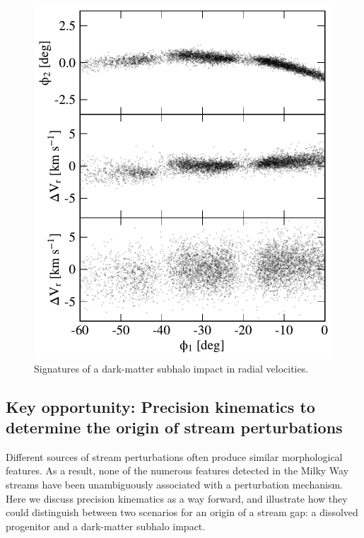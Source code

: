 \documentclass[final,5p,times,twocolumn,authoryear]{elsarticle}
\begin{document}
\begin{figure}[t!]
\begin{center}
\includegraphics[width=\columnwidth]{figures/rv_signal.pdf}
\end{center}
\caption{%
Signatures of a dark-matter subhalo impact in radial velocities.
\label{fig:rv_signal}
}
\end{figure}

\subsection{Key opportunity: Precision kinematics to determine the origin of stream perturbations}
\label{sec:xkinematics}
Different sources of stream perturbations often produce similar morphological features.
As a result, none of the numerous features detected in the Milky Way streams have been unambiguously associated with a perturbation mechanism.
Here we discuss precision kinematics as a way forward, and illustrate how they could distinguish between two scenarios for an origin of a stream gap: a dissolved progenitor and a dark-matter subhalo impact.
\end{document}
